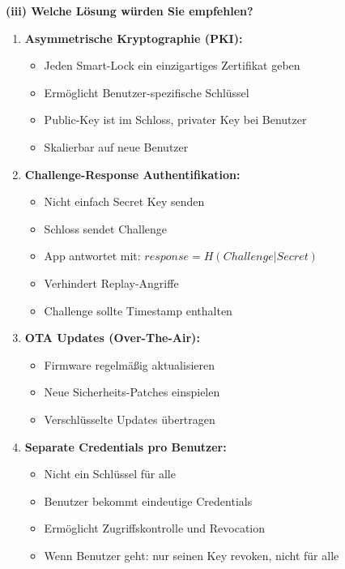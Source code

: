 \documentclass[12pt,a4paper]{article}
\begin{document}
\begin{tcolorbox}[colback=solutionbg, colframe=black!30]

\textbf{(iii) Welche Lösung würden Sie empfehlen?} \checkmark

\begin{enumerate}[1.]
    \item \textbf{Asymmetrische Kryptographie (PKI):}
    \begin{itemize}
        \item Jeden Smart-Lock ein einzigartiges Zertifikat geben
        \item Ermöglicht Benutzer-spezifische Schlüssel
        \item Public-Key ist im Schloss, privater Key bei Benutzer
        \item Skalierbar auf neue Benutzer
    \end{itemize}
    
    \item \textbf{Challenge-Response Authentifikation:}
    \begin{itemize}
        \item Nicht einfach Secret Key senden
        \item Schloss sendet Challenge
        \item App antwortet mit: $response = H(Challenge | Secret)$
        \item Verhindert Replay-Angriffe
        \item Challenge sollte Timestamp enthalten
    \end{itemize}
    
    \item \textbf{OTA Updates (Over-The-Air):}
    \begin{itemize}
        \item Firmware regelmäßig aktualisieren
        \item Neue Sicherheits-Patches einspielen
        \item Verschlüsselte Updates übertragen
    \end{itemize}
    
    \item \textbf{Separate Credentials pro Benutzer:}
    \begin{itemize}
        \item Nicht ein Schlüssel für alle
        \item Benutzer bekommt eindeutige Credentials
        \item Ermöglicht Zugriffskontrolle und Revocation
        \item Wenn Benutzer geht: nur seinen Key revoken, nicht für alle
    \end{itemize}
    

\end{enumerate}
\end{tcolorbox}
\end{document}

